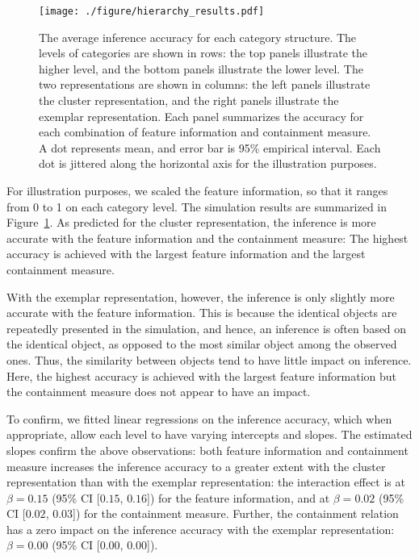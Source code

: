 \documentclass[doc]{apa6}
\begin{document}
\begin{figure}[t!]
    \centering
    \texttt{[image: ./figure/hierarchy\_results.pdf]}

    \caption{The average inference accuracy for each category structure. The levels of categories
    are shown in rows: the top panels illustrate the higher level, and the bottom panels illustrate
    the lower level.  The two representations are shown in columns: the left panels illustrate the
    cluster representation, and the right panels illustrate the exemplar representation.  Each panel
    summarizes the accuracy for each combination of feature information and containment measure. A
    dot represents mean, and error bar is 95\% empirical interval.  Each dot is jittered along the
    horizontal axis for the illustration purposes.}

\label{fig:result}
\end{figure}

For illustration purposes, we scaled the feature information, so that it ranges from 0 to 1 on each
category level. The simulation results are summarized in Figure~\ref{fig:result}. As predicted for
the cluster representation, the inference is more accurate with the feature information and the
containment measure: The highest accuracy is achieved with the largest feature information and the
largest containment measure.

With the exemplar representation, however, the inference is only slightly more accurate with the
feature information. This is because the identical objects are repeatedly presented in the
simulation, and hence, an inference is often based on the identical object, as opposed to the most
similar object among the observed ones. Thus, the similarity between objects tend to have little
impact on inference.  Here, the highest accuracy is achieved with the largest feature information
but the containment measure does not appear to have an impact.

To confirm, we fitted linear regressions on the inference accuracy, which when appropriate, allow
each level to have varying intercepts and slopes. The estimated slopes confirm the above
observations: both feature information and containment measure increases the inference accuracy to a
greater extent with the cluster representation than with the exemplar representation: the
interaction effect is at $\beta=0.15$ (95\% CI [$0.15$, $0.16$]) for the feature information, and at
$\beta=0.02$ (95\% CI [$0.02$, $0.03$]) for the containment measure. Further, the containment
relation has a zero impact on the inference accuracy with the exemplar representation: $\beta=0.00$
(95\% CI [$0.00$, $0.00$]).
\end{document}
